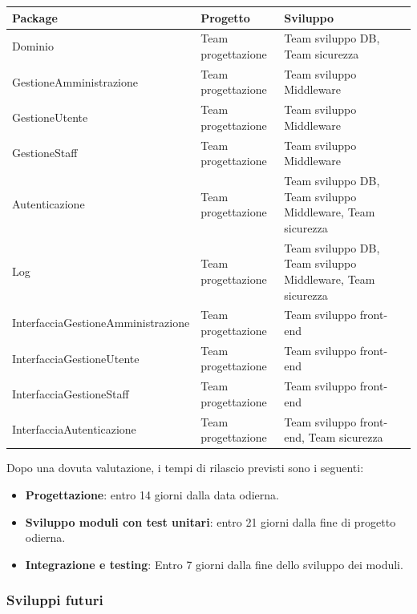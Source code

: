 \documentclass[a4paper]{article}
\begin{document}
\begin{center}
    \begin{tabularx}{1\textwidth}{|X|X|X|X|}
    \hline
    \textbf{Package} & \textbf{Progetto} & \textbf{Sviluppo}\\
    \hline
    \hline
    Dominio & Team progettazione & Team sviluppo DB, Team sicurezza  \\
    \hline
    GestioneAmministrazione & Team progettazione & Team sviluppo Middleware\\
    \hline
    GestioneUtente & Team progettazione & Team sviluppo Middleware\\
    \hline
    GestioneStaff & Team progettazione & Team sviluppo Middleware\\
    \hline
    Autenticazione & Team progettazione & Team sviluppo DB, Team sviluppo Middleware, Team sicurezza\\
    \hline
    Log & Team progettazione & Team sviluppo DB, Team sviluppo Middleware, Team sicurezza\\
    \hline
    InterfacciaGestioneAmministrazione & Team progettazione & Team sviluppo front-end \\
    \hline
    InterfacciaGestioneUtente & Team progettazione & Team sviluppo front-end \\
    \hline
    InterfacciaGestioneStaff & Team progettazione & Team sviluppo front-end\\
    \hline
    InterfacciaAutenticazione & Team progettazione & Team sviluppo front-end, Team sicurezza\\
    \hline
    \end{tabularx}
\end{center}

Dopo una dovuta valutazione, i tempi di rilascio previsti sono i seguenti:

\begin{itemize}
    \item \textbf{Progettazione}: entro 14 giorni dalla data odierna.
    \item \textbf{Sviluppo moduli con test unitari}: entro 21 giorni dalla fine di progetto odierna.
    \item \textbf{Integrazione e testing}: Entro 7 giorni dalla fine dello sviluppo dei moduli.
\end{itemize}

\subsubsection{Sviluppi futuri}
\end{document}

